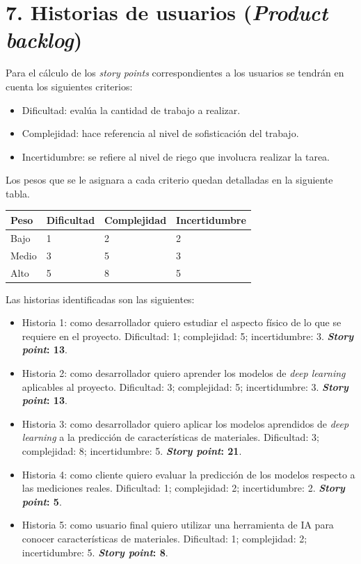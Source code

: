 \documentclass[
11pt, %
codirector, %
]{charter}
\begin{document}
\section{7. Historias de usuarios (\textit{Product backlog})}
\label{sec:backlog}




Para el cálculo de los \textit{story points} correspondientes a los
usuarios se tendrán en cuenta los siguientes criterios:

\begin{itemize}
	\item Dificultad: evalúa la cantidad de trabajo a realizar.
	\item Complejidad: hace referencia al nivel de sofisticación del trabajo.
	\item Incertidumbre: se refiere al nivel de riego que involucra realizar
	la tarea. 
\end{itemize}

Los pesos que se le asignara a cada criterio quedan detalladas en la siguiente tabla.


\begin{table}[H]
	\begin{tabularx}{\linewidth}{@{}|l|X|X|l|@{}}
	\hline
	\rowcolor[HTML]{C0C0C0} 
	Peso   & Dificultad & Complejidad 	& Incertidumbre 	\\ \hline
	Bajo   & 1      & 2	&  2   	\\ \hline
	Medio  & 3      & 5 &  3	\\ \hline
	Alto   & 5      & 8 &  5  	\\ \hline
	\end{tabularx}
\end{table}


Las historias identificadas son las siguientes:

\begin{itemize}
	\item Historia 1: como desarrollador quiero estudiar el aspecto físico
	de lo que se requiere en el proyecto. Dificultad: 1; complejidad: 5; incertidumbre: 3.  \textbf{\textit{Story point}: 13}.
	\item Historia 2: como desarrollador quiero aprender los modelos de \textit{deep learning} 
	aplicables al proyecto. Dificultad: 3; complejidad: 5; incertidumbre: 3.  \textbf{\textit{Story point}: 13}.
	\item Historia 3: como desarrollador quiero aplicar los modelos aprendidos de \textit{deep learning} 
	a la predicción de características de materiales.
	Dificultad: 3; complejidad: 8; incertidumbre: 5. \textbf{\textit{Story point}: 21}.
	\item Historia 4: como cliente quiero evaluar la predicción de los modelos respecto
	a las mediciones reales. 
	Dificultad: 1; complejidad: 2; incertidumbre: 2. \textbf{\textit{Story point}: 5}.
	\item Historia 5: como usuario final quiero utilizar una herramienta de IA para
	conocer características de materiales. 
	Dificultad: 1; complejidad: 2; incertidumbre: 5. \textbf{\textit{Story point}: 8}.
\end{itemize}
\end{document}
